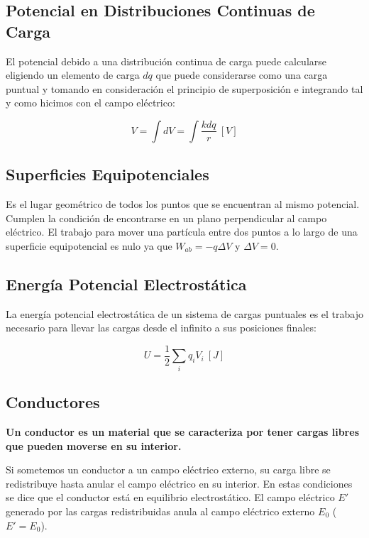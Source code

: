 \documentclass{tufte-handout}
\begin{document}
\subsection{Potencial en Distribuciones Continuas de Carga}

El potencial debido a una distribución continua de carga puede calcularse eligiendo un elemento de carga $dq$ que puede considerarse como una carga puntual y tomando en consideración el principio de superposición e integrando tal y como hicimos con el campo eléctrico: 

\begin{equation}
V = \int dV = \int \frac{k dq}{r}~[V]
\end{equation}

\subsection{Superficies Equipotenciales}

Es el lugar geométrico de todos los puntos que se encuentran al mismo potencial. Cumplen la condición de encontrarse en un plano perpendicular al campo eléctrico. El trabajo para mover una partícula entre dos puntos a lo largo de una superficie equipotencial es nulo ya que $W_{ab} = -q\Delta V$ y $\Delta V = 0$.

\subsection{Energía Potencial Electrostática}

La energía potencial electrostática de un sistema de cargas puntuales es el trabajo necesario para llevar las cargas desde el infinito a sus posiciones finales:

\begin{equation}
U = \frac{1}{2}\sum_i q_iV_i ~[J]
\end{equation}

\subsection{Conductores}

\textbf{Un conductor es un material que se caracteriza por tener cargas libres que pueden moverse en su interior.}

Si sometemos un conductor a un campo eléctrico externo, su carga libre se redistribuye hasta anular el campo eléctrico en su interior. En estas condiciones se dice que el conductor está en equilibrio electrostático. El campo eléctrico $E'$ generado por las cargas redistribuidas anula al campo eléctrico externo $E_0$ ($E' = E_0$).
\end{document}
